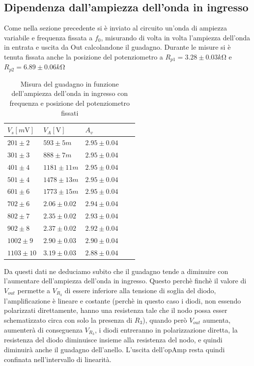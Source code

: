\documentclass[10pt, a4paper, italian]{article}
\begin{document}
\subsection{Dipendenza dall'ampiezza dell'onda in ingresso}
Come nella sezione precedente si è inviato al circuito un'onda di ampiezza variabile e frequenza fissata a $f_0$, misurando di volta in volta l'ampiezza dell'onda in entrata e uscita da Out calcolandone il guadagno. Durante le misure si è tenuta fissata anche la posizione del potenziometro a $R_{p1}=3.28 \pm 0.03 \si{k\ohm}$ e $R_{p2}=6.89 \pm 0.06\si{k\ohm}$
\begin{table}[H]
\centering
\begin{tabular}{@{}lllll@{}}
\toprule
$V_{s} [\si{m\V}]$ & $V_{A} [\si{\V}]$ & $A_v$ \\
\midrule
$201 \pm 2$ 	& $ 593 \pm 5 m$	& $2.95 \pm 0.04$\\
$301 \pm 3$ 	& $ 888 \pm 7 m$	& $2.95 \pm 0.04$\\
$401 \pm 4$ 	& $ 1181 \pm 11 m$	& $2.95 \pm 0.04$\\
$501 \pm 4$ 	& $ 1478 \pm 13 m$	& $2.95 \pm 0.04$\\
$601 \pm 6$ 	& $ 1773 \pm 15 m$	& $2.95 \pm 0.04$\\
$702 \pm 6$ 	& $ 2.06 \pm 0.02$	& $2.94 \pm 0.04$\\
$802 \pm 7$ 	& $ 2.35 \pm 0.02$	& $2.93 \pm 0.04$\\
$902 \pm 8$ 	& $ 2.37 \pm 0.02$	& $2.92 \pm 0.04$\\
$1002 \pm 9$ 	& $ 2.90 \pm 0.03$	& $2.90 \pm 0.04$\\
$1103 \pm 10$ 	& $ 3.19 \pm 0.03$	& $2.88 \pm 0.04$\\


\bottomrule
\end{tabular}
\caption{Misura del guadagno in funzione dell'ampiezza dell'onda in ingresso con frequenza e posizione del potenziometro fissati}
\end{table}
Da questi dati ne deduciamo subito che il guadagno tende a diminuire con l'aumentare dell'ampiezza dell'onda in ingresso. Questo perchè finchè il valore di $V_{out}$ permette a $V_{R_3}$ di essere inferiore alla tensione di soglia del diodo, l'amplificazione è lineare e costante (perchè in questo caso i diodi, non essendo polarizzati direttamente, hanno una resistenza tale che il nodo possa esser schematizzato circa con solo la presenza di $R_3$), quando però $V_{out}$ aumenta, aumenterà di conseguenza $V_{R_3}$, i diodi entreranno in polarizzazione diretta, la resistenza del diodo diminuisce insieme alla resistenza del nodo, e quindi diminuirà anche il guadagno dell'anello. L'uscita dell'opAmp resta quindi confinata nell'intervallo di linearità.
\end{document}
